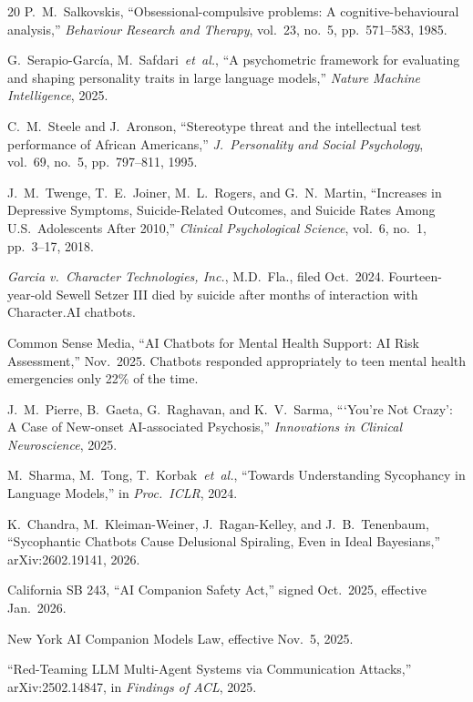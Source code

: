 \documentclass[conference]{IEEEtran}
\begin{document}
\begin{thebibliography}{20}
P.~M.~Salkovskis, ``Obsessional-compulsive problems: A cognitive-behavioural analysis,'' \textit{Behaviour Research and Therapy}, vol.~23, no.~5, pp.~571--583, 1985.

G.~Serapio-Garc\'{i}a, M.~Safdari~\textit{et~al.}, ``A psychometric framework for evaluating and shaping personality traits in large language models,'' \textit{Nature Machine Intelligence}, 2025.

C.~M.~Steele and J.~Aronson, ``Stereotype threat and the intellectual test performance of African Americans,'' \textit{J.\ Personality and Social Psychology}, vol.~69, no.~5, pp.~797--811, 1995.

J.~M.~Twenge, T.~E.~Joiner, M.~L.~Rogers, and G.~N.~Martin, ``Increases in Depressive Symptoms, Suicide-Related Outcomes, and Suicide Rates Among U.S.\ Adolescents After 2010,'' \textit{Clinical Psychological Science}, vol.~6, no.~1, pp.~3--17, 2018.

\textit{Garcia v.\ Character Technologies, Inc.}, M.D.\ Fla., filed Oct.\ 2024. Fourteen-year-old Sewell Setzer III died by suicide after months of interaction with Character.AI chatbots.

Common Sense Media, ``AI Chatbots for Mental Health Support: AI Risk Assessment,'' Nov.\ 2025. Chatbots responded appropriately to teen mental health emergencies only 22\% of the time.

J.~M.~Pierre, B.~Gaeta, G.~Raghavan, and K.~V.~Sarma, ```You're Not Crazy': A Case of New-onset AI-associated Psychosis,'' \textit{Innovations in Clinical Neuroscience}, 2025.

M.~Sharma, M.~Tong, T.~Korbak~\textit{et~al.}, ``Towards Understanding Sycophancy in Language Models,'' in \textit{Proc.\ ICLR}, 2024.

K.~Chandra, M.~Kleiman-Weiner, J.~Ragan-Kelley, and J.~B.~Tenenbaum, ``Sycophantic Chatbots Cause Delusional Spiraling, Even in Ideal Bayesians,'' arXiv:2602.19141, 2026.

California SB 243, ``AI Companion Safety Act,'' signed Oct.\ 2025, effective Jan.\ 2026.

New York AI Companion Models Law, effective Nov.\ 5, 2025.

``Red-Teaming LLM Multi-Agent Systems via Communication Attacks,'' arXiv:2502.14847, in \textit{Findings of ACL}, 2025.


\end{thebibliography}
\end{document}

